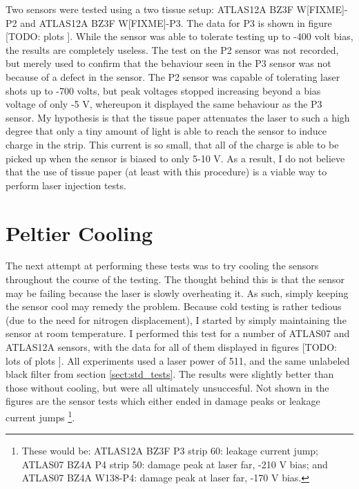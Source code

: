 \documentclass{report}
\begin{document}
            Two sensors were tested using a two tissue setup: ATLAS12A BZ3F W[FIXME]-P2 and ATLAS12A BZ3F W[FIXME]-P3. The data for P3 is shown in figure [TODO: plots
            ]. While the sensor was able to tolerate testing up to -400 volt bias, the results are completely useless. The test on the P2 sensor was not recorded, but merely used to confirm that the behaviour seen in the P3 sensor was not because of a defect in the sensor. The P2 sensor was capable of tolerating laser shots up to -700 volts, but peak voltages stopped increasing beyond a bias voltage of only -5 V, whereupon it displayed the same behaviour as the P3 sensor. My hypothesis is that the tissue paper attenuates the laser to such a high degree that only a tiny amount of light is able to reach the sensor to induce charge in the strip. This current is so small, that all of the charge is able to be picked up when the sensor is biased to only 5-10 V. As a result, I do not believe that the use of tissue paper (at least with this procedure) is a viable way to perform laser injection tests.

            

        \section{Peltier Cooling}
            The next attempt at performing these tests was to try cooling the sensors throughout the course of the testing. The thought behind this is that the sensor may be failing because the laser is slowly overheating it. As such, simply keeping the sensor cool may remedy the problem. Because cold testing is rather tedious (due to the need for nitrogen displacement), I started by simply maintaining the sensor at room temperature. I performed this test for a number of ATLAS07 and ATLAS12A sensors, with the data for all of them displayed in figures [TODO: lots of plots
            ]. All experiments used a laser power of 511, and the same unlabeled black filter from section \ref{sect:std_tests}. The results were slightly better than those without cooling, but were all ultimately unsuccesful. Not shown in the figures are the sensor tests which either ended in damage peaks or leakage current jumps \footnote{These would be: ATLAS12A BZ3F P3 strip 60: leakage current jump; ATLAS07 BZ4A P4 strip 50: damage peak at laser far, -210 V bias; and ATLAS07 BZ4A W138-P4: damage peak at laser far, -170 V bias.}.
\end{document}
